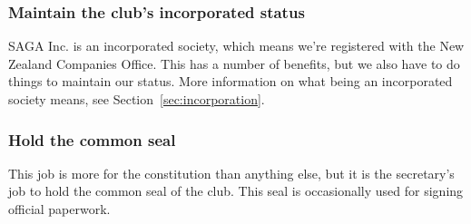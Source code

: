 \subsubsection{Maintain the club's incorporated status}

SAGA Inc. is an incorporated society, which means we're registered with the New Zealand Companies Office. This has a number of benefits, but we also have to do things to maintain our status. More information on what being an incorporated society means, see Section~\ref{sec:incorporation}.

\subsubsection{Hold the common seal}

This job is more for the constitution than anything else, but it is the secretary's job to hold the common seal of the club. This seal is occasionally used for signing official paperwork.